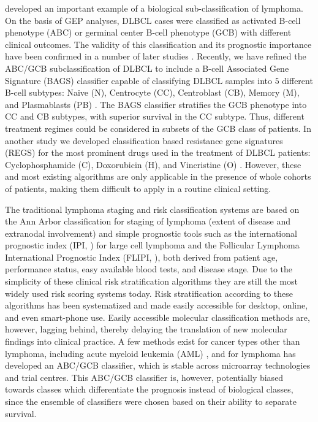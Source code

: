 \documentclass[10pt,letterpaper]{article}
\begin{document}
\cite{Alizadeh2000} developed an important example of a biological sub-classification of lymphoma.
On the basis of GEP analyses, DLBCL cases were classified as activated B-cell phenotype (ABC) or germinal center B-cell phenotype (GCB) with different clinical outcomes.
The validity of this classification and its prognostic importance have been confirmed in a number of later studies \cite{Rosenwald2002a,Hans2004,Poulsen2005,Lenz2008a,Monti2012a}.
Recently, we have refined the ABC/GCB subclassification of DLBCL to include a B-cell Associated Gene Signature (BAGS) classifier capable of classifying DLBCL samples into $5$ different B-cell subtypes:
Naive (N), Centrocyte (CC), Centroblast (CB), Memory (M), and Plasmablasts (PB) \cite{DybkaerBoegsted2015}.
The BAGS classifier stratifies the GCB phenotype into CC and CB subtypes, with superior survival in the CC subtype. Thus, different treatment regimes could be considered in subsets of the GCB class of patients.
In another study we developed classification based resistance gene signatures (REGS) for the most prominent drugs used in the treatment of DLBCL patients:
Cyclophosphamide (C), Doxorubicin (H), and Vincristine (O) \cite{Falgreen2015}.
However, these and most existing algorithms are only applicable in the presence of whole cohorts of patients, making them difficult to apply in a routine clinical setting.

The traditional lymphoma staging and risk classification systems are based on the Ann Arbor classification for staging of lymphoma (extent of disease and extranodal involvement) and simple prognostic tools such as the international prognostic index (IPI, \cite{IPI}) for large cell lymphoma and the Follicular Lymphoma International Prognostic Index (FLIPI, \cite{FLIPI}), both derived from patient age, performance status, easy available blood tests, and disease stage.
Due to the simplicity of these clinical risk stratification algorithms they are still the most widely used risk scoring systems today.
Risk stratification according to these algorithms has been systematized and made easily accessible for desktop, online, and even smart-phone use.
Easily accessible molecular classification methods are, however, lagging behind, thereby delaying the translation of new molecular findings into clinical practice.
A few methods exist for cancer types other than lymphoma, including acute myeloid leukemia (AML) \mbox{\cite{Huang2009}}, and for lymphoma \mbox{\cite{Care2013}} has developed an ABC/GCB classifier, which is stable across microarray technologies and trial centres. This ABC/GCB classifier is, however, potentially biased towards classes which differentiate the prognosis instead of biological classes, since the ensemble of classifiers were chosen based on their ability to separate survival.
\end{document}
